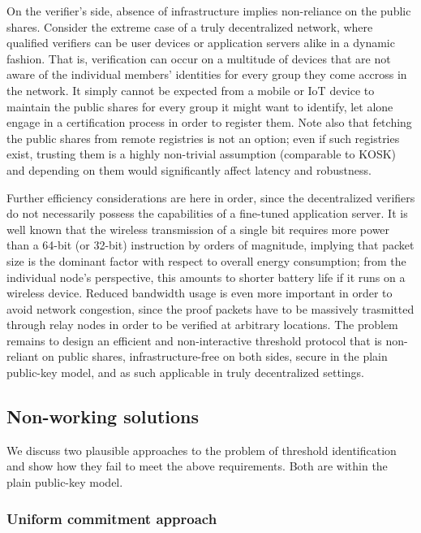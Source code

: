 \documentclass{iacrtrans}
\begin{document}
On the verifier's side, absence of infrastructure
implies non-reliance on the public shares.
Consider the extreme case of a
truly decentralized network,
where qualified verifiers can be user devices
or application servers alike in a dynamic fashion.
That is, verification can occur
on a multitude of devices that are not aware
of the individual members' identities for every group
they come accross in the network.
It simply cannot be expected from a mobile or IoT device
to maintain the public shares for every group
it might want to identify,
let alone engage in a certification process
in order to register them.
Note also that fetching the public shares
from remote registries is not an option;
even if such registries exist,
trusting them is a highly non-trivial assumption
(comparable to KOSK)
and depending on them would significantly affect
latency and robustness.

Further efficiency considerations are here in order,
since the decentralized verifiers do not necessarily possess
the capabilities of a fine-tuned application server.
It is well known that the wireless transmission
of a single bit requires more power
than a 64-bit (or 32-bit) instruction by orders of magnitude,
implying that packet size is
the dominant factor with respect to overall energy consumption;
from the individual node's perspective,
this amounts to shorter battery life
if it runs on a wireless device.
Reduced bandwidth usage is even more important
in order to avoid network congestion,
since the proof packets have to be massively trasmitted
through relay nodes
in order to be verified at arbitrary locations.
The problem remains to
design an efficient and non-interactive threshold protocol
that is non-reliant on public shares, infrastructure-free
on both sides, secure in the plain public-key model,
and as such applicable in truly decentralized settings.



\subsection{Non-working solutions}\label{section_non_working_solutions}

We discuss two plausible approaches to the
problem of threshold identification
and show how they fail to meet
the above requirements.
Both are within the plain public-key model.

\subsubsection{Uniform commitment approach}\label{section_uniform_commitment}
\end{document}
